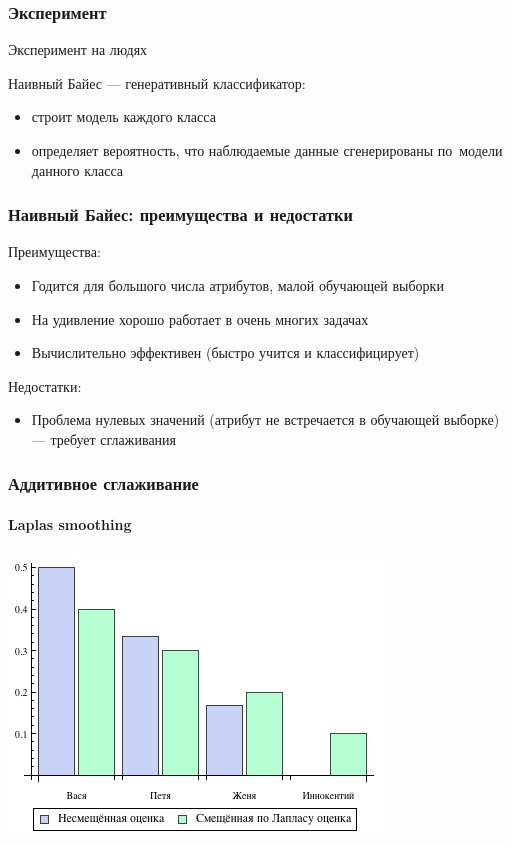 \documentclass[svgnames]{beamer}
\begin{document}
\begin{frame}
  \frametitle{Эксперимент}
  \alert{Эксперимент на людях}
\end{frame}


\begin{frame}[standout]
  Наивный Байес — генеративный классификатор:

  \begin{itemize}
  \item строит модель каждого класса
  \item определяет вероятность, что наблюдаемые данные \alert{сгенерированы} по~модели
    данного класса
  \end{itemize}
\end{frame}

\begin{frame}
  \frametitle{Наивный Байес: преимущества и недостатки}
  Преимущества:
  \begin{itemize}
  \item Годится для большого числа атрибутов, малой обучающей выборки
  \item На удивление хорошо работает в очень многих задачах
  \item Вычислительно эффективен (быстро учится и классифицирует)
  \end{itemize}
  Недостатки:
  \begin{itemize}
  \item Проблема нулевых значений (атрибут не встречается в обучающей
    выборке) — требует сглаживания
  \end{itemize}
\end{frame}

\begin{frame}
  \frametitle{Аддитивное сглаживание}
  \framesubtitle{Laplas smoothing}
  \includegraphics[width=.7\textwidth]{additive-smoothing}
\end{frame}
\end{document}
